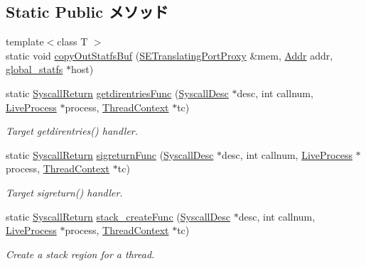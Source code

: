 \subsection*{Static Public メソッド}
\begin{DoxyCompactItemize}
\item 
{\footnotesize template$<$class T $>$ }\\static void \hyperlink{classTru64_ab39f4973592abe61638b8b998bc5691d}{copyOutStatfsBuf} (\hyperlink{classSETranslatingPortProxy}{SETranslatingPortProxy} \&mem, \hyperlink{base_2types_8hh_af1bb03d6a4ee096394a6749f0a169232}{Addr} addr, \hyperlink{kern_2tru64_2tru64_8hh_a1a8529336c3f2704cb49ee2cd97412a8}{global\_\-statfs} $\ast$host)
\item 
static \hyperlink{classSyscallReturn}{SyscallReturn} \hyperlink{classTru64_a2e7bba81ca6d880e6cbf4e1db6100a68}{getdirentriesFunc} (\hyperlink{classSyscallDesc}{SyscallDesc} $\ast$desc, int callnum, \hyperlink{classLiveProcess}{LiveProcess} $\ast$process, \hyperlink{classThreadContext}{ThreadContext} $\ast$tc)
\begin{DoxyCompactList}\small\item\em Target getdirentries() handler. \item\end{DoxyCompactList}\item 
static \hyperlink{classSyscallReturn}{SyscallReturn} \hyperlink{classTru64_a368f998d81d17c06f2fb1639683f8302}{sigreturnFunc} (\hyperlink{classSyscallDesc}{SyscallDesc} $\ast$desc, int callnum, \hyperlink{classLiveProcess}{LiveProcess} $\ast$process, \hyperlink{classThreadContext}{ThreadContext} $\ast$tc)
\begin{DoxyCompactList}\small\item\em Target sigreturn() handler. \item\end{DoxyCompactList}\item 
static \hyperlink{classSyscallReturn}{SyscallReturn} \hyperlink{classTru64_ac6e3676ee42b0ad6a609f36f0cf654bb}{stack\_\-createFunc} (\hyperlink{classSyscallDesc}{SyscallDesc} $\ast$desc, int callnum, \hyperlink{classLiveProcess}{LiveProcess} $\ast$process, \hyperlink{classThreadContext}{ThreadContext} $\ast$tc)
\begin{DoxyCompactList}\small\item\em Create a stack region for a thread. \item\end{DoxyCompactList}\item 

\end{DoxyCompactItemize}
